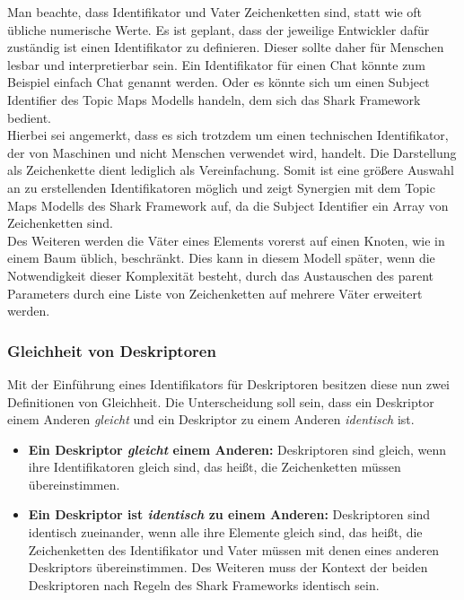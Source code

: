 \documentclass[a4paper]{article}
\begin{document}
	Man beachte, dass Identifikator und Vater Zeichenketten sind, statt wie
	oft übliche numerische Werte. Es ist geplant, dass der jeweilige Entwickler
	dafür zuständig ist einen Identifikator zu definieren. Dieser sollte daher
	für Menschen lesbar und interpretierbar sein. Ein Identifikator für einen
	Chat könnte zum Beispiel einfach Chat genannt werden. Oder es könnte sich um
	einen Subject Identifier des Topic Maps Modells handeln, dem sich das Shark
	Framework bedient. \\
	
	Hierbei sei angemerkt, dass es sich trotzdem um einen technischen Identifikator,
	der von Maschinen und nicht Menschen verwendet wird, handelt. Die Darstellung
	als Zeichenkette dient lediglich als Vereinfachung. Somit ist eine größere
	Auswahl an zu erstellenden Identifikatoren möglich und zeigt Synergien 
	mit dem Topic Maps Modells des Shark Framework auf, da die Subject Identifier
	ein Array von Zeichenketten sind. \\
	
	Des Weiteren werden die Väter eines Elements vorerst auf einen Knoten,
	wie in einem Baum üblich, beschränkt. Dies kann in diesem Modell später,
	wenn die Notwendigkeit dieser Komplexität besteht, durch das Austauschen des
	parent Parameters durch eine Liste von Zeichenketten auf mehrere Väter erweitert
	werden.
	
	\subsubsection{Gleichheit von Deskriptoren}
	
	Mit der Einführung eines Identifikators für Deskriptoren besitzen
	diese nun zwei Definitionen von Gleichheit. Die Unterscheidung soll sein,
	dass ein Deskriptor einem Anderen \emph{gleicht} und ein Deskriptor zu
	einem Anderen \emph{identisch} ist.
	
	\begin{itemize}
		\item \textbf{Ein Deskriptor \emph{gleicht} einem Anderen:} Deskriptoren
		sind gleich, wenn ihre Identifikatoren gleich sind, das heißt, die
		Zeichenketten müssen übereinstimmen.
		\item \textbf{Ein Deskriptor ist \emph{identisch} zu einem Anderen:}
		Deskriptoren sind identisch zueinander, wenn alle ihre Elemente gleich sind,
		das heißt, die Zeichenketten des Identifikator und Vater müssen mit denen
		eines anderen Deskriptors übereinstimmen. Des Weiteren muss der Kontext
		der beiden Deskriptoren nach Regeln des Shark Frameworks identisch sein.
	\end{itemize} 	
	
\end{document}
